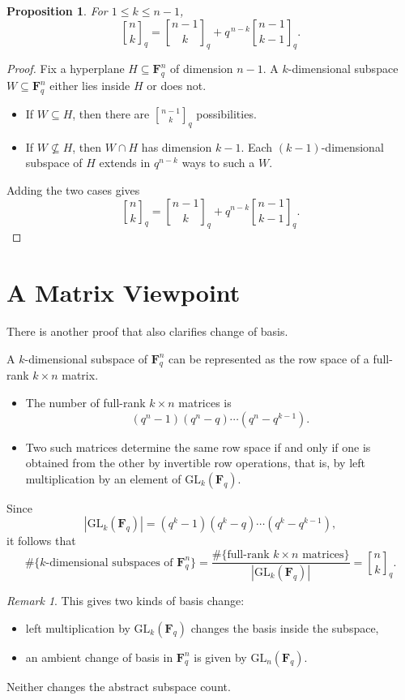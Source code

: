 \documentclass[11pt]{article}
\newtheorem{proposition}[theorem]{Proposition}
\theoremstyle{definition}
\theoremstyle{remark}
\newtheorem{remark}[theorem]{Remark}
\newcommand{\F}{\mathbf{F}}
\newcommand{\GL}{\mathrm{GL}}
\newcommand{\qbinom}[2]{\genfrac{[}{]}{0pt}{}{#1}{#2}_q}
\begin{document}
	\begin{proposition}
		For \(1\le k\le n-1\),
		\[
		\qbinom{n}{k}
		=
		\qbinom{n-1}{k}
		+
		q^{\,n-k}\qbinom{n-1}{k-1}.
		\]
	\end{proposition}
	
	\begin{proof}
		Fix a hyperplane \(H\subseteq \F_q^n\) of dimension \(n-1\). A \(k\)-dimensional subspace \(W\subseteq \F_q^n\) either lies inside \(H\) or does not.
		
		\begin{itemize}
			\item If \(W\subseteq H\), then there are \(\qbinom{n-1}{k}\) possibilities.
			\item If \(W\not\subseteq H\), then \(W\cap H\) has dimension \(k-1\). Each \((k-1)\)-dimensional subspace of \(H\) extends in \(q^{n-k}\) ways to such a \(W\).
		\end{itemize}
		
		Adding the two cases gives
		\[
		\qbinom{n}{k}
		=
		\qbinom{n-1}{k}
		+
		q^{n-k}\qbinom{n-1}{k-1}.
		\]
	\end{proof}
	
	\section{A Matrix Viewpoint}
	
	There is another proof that also clarifies change of basis.
	
	A \(k\)-dimensional subspace of \(\F_q^n\) can be represented as the row space of a full-rank \(k\times n\) matrix.
	
	\begin{itemize}
		\item The number of full-rank \(k\times n\) matrices is
		\[
		(q^n-1)(q^n-q)\cdots(q^n-q^{k-1}).
		\]
		\item Two such matrices determine the same row space if and only if one is obtained from the other by invertible row operations, that is, by left multiplication by an element of \(\GL_k(\F_q)\).
	\end{itemize}
	
	Since
	\[
	|\GL_k(\F_q)|
	=
	(q^k-1)(q^k-q)\cdots(q^k-q^{k-1}),
	\]
	it follows that
	\[
	\#\{\text{\(k\)-dimensional subspaces of }\F_q^n\}
	=
	\frac{\#\{\text{full-rank }k\times n\text{ matrices}\}}
	{|\GL_k(\F_q)|}
	=
	\qbinom{n}{k}.
	\]
	
	\begin{remark}
		This gives two kinds of basis change:
		\begin{itemize}
			\item left multiplication by \(\GL_k(\F_q)\) changes the basis inside the subspace,
			\item an ambient change of basis in \(\F_q^n\) is given by \(\GL_n(\F_q)\).
		\end{itemize}
		Neither changes the abstract subspace count.
	\end{remark}
	
\end{document}
